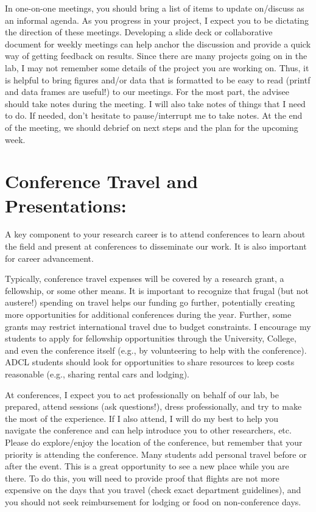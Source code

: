 \documentclass[11pt,letterpaper]{article}
\begin{document}
In one-on-one meetings, you should bring a list of items to update on/discuss as an informal agenda. As you progress in your project, I expect you to be dictating the direction of these meetings. Developing a slide deck or collaborative document for weekly meetings can help anchor the discussion and provide a quick way of getting feedback on results. Since there are many projects going on in the lab, I may not remember some details of the project you are working on. Thus, it is helpful to bring figures and/or data that is formatted to be easy to read (printf and data frames are useful!) to our meetings. For the most part, the advisee should take notes during the meeting. I will also take notes of things that I need to do. If needed, don't hesitate to pause/interrupt me to take notes. At the end of the meeting, we should debrief on next steps and the plan for the upcoming week.

\section{Conference Travel and Presentations:} A key component to your research career is to attend conferences to learn about the field and present at conferences to disseminate our work. It is also important for career advancement.

Typically, conference travel expenses will be covered by a research grant, a fellowship, or some other means. It is important to recognize that frugal (but not austere!) spending on travel helps our funding go further, potentially creating more opportunities for additional conferences during the year. Further, some grants may restrict international travel due to budget constraints. I encourage my students to apply for fellowship opportunities through the University, College, and even the conference itself (e.g., by volunteering to help with the conference). ADCL students should look for opportunities to share resources to keep costs reasonable (e.g., sharing rental cars and lodging).

At conferences, I expect you to act professionally on behalf of our lab, be prepared, attend sessions (ask questions!), dress professionally, and try to make the most of the experience. If I also attend, I will do my best to help you navigate the conference and can help introduce you to other researchers, etc. Please do explore/enjoy the location of the conference, but remember that your priority is attending the conference. Many students add personal travel before or after the event. This is a great opportunity to see a new place while you are there. To do this, you will need to provide proof that flights are not more expensive on the days that you travel (check exact department guidelines), and you should not seek reimbursement for lodging or food on non-conference days. 
\end{document}
